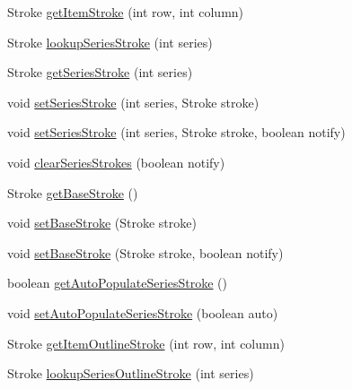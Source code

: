 \begin{DoxyCompactItemize}
\item 
Stroke \mbox{\hyperlink{classorg_1_1jfree_1_1chart_1_1renderer_1_1_abstract_renderer_a269e4670b8c0cf62714bbf4040e01cfa}{get\+Item\+Stroke}} (int row, int column)
\item 
Stroke \mbox{\hyperlink{classorg_1_1jfree_1_1chart_1_1renderer_1_1_abstract_renderer_a883eab51fd555ce119249384790c6d10}{lookup\+Series\+Stroke}} (int series)
\item 
Stroke \mbox{\hyperlink{classorg_1_1jfree_1_1chart_1_1renderer_1_1_abstract_renderer_aa9fd470dafc2d0596ff1ea4ffcb210bc}{get\+Series\+Stroke}} (int series)
\item 
void \mbox{\hyperlink{classorg_1_1jfree_1_1chart_1_1renderer_1_1_abstract_renderer_a3cc8ebf3993621a79db959209be1b184}{set\+Series\+Stroke}} (int series, Stroke stroke)
\item 
void \mbox{\hyperlink{classorg_1_1jfree_1_1chart_1_1renderer_1_1_abstract_renderer_ab32a54a55641ca4e5d6471d3acb9a9ea}{set\+Series\+Stroke}} (int series, Stroke stroke, boolean notify)
\item 
void \mbox{\hyperlink{classorg_1_1jfree_1_1chart_1_1renderer_1_1_abstract_renderer_a229c7ac9859bddca844b7219b563bb96}{clear\+Series\+Strokes}} (boolean notify)
\item 
Stroke \mbox{\hyperlink{classorg_1_1jfree_1_1chart_1_1renderer_1_1_abstract_renderer_a7590a423fb0ba5895a876a7068b37951}{get\+Base\+Stroke}} ()
\item 
void \mbox{\hyperlink{classorg_1_1jfree_1_1chart_1_1renderer_1_1_abstract_renderer_a33600c32414c464c6394827d61f9b374}{set\+Base\+Stroke}} (Stroke stroke)
\item 
void \mbox{\hyperlink{classorg_1_1jfree_1_1chart_1_1renderer_1_1_abstract_renderer_acd0db81ab3940b3e32648ffdce99ed21}{set\+Base\+Stroke}} (Stroke stroke, boolean notify)
\item 
boolean \mbox{\hyperlink{classorg_1_1jfree_1_1chart_1_1renderer_1_1_abstract_renderer_adbbbcbf044e84a629e488d904f88442e}{get\+Auto\+Populate\+Series\+Stroke}} ()
\item 
void \mbox{\hyperlink{classorg_1_1jfree_1_1chart_1_1renderer_1_1_abstract_renderer_aa6fc1f6e57125ab3c30523424b3123bd}{set\+Auto\+Populate\+Series\+Stroke}} (boolean auto)
\item 
Stroke \mbox{\hyperlink{classorg_1_1jfree_1_1chart_1_1renderer_1_1_abstract_renderer_ae283acd1318cfbff61d6128ac4649f54}{get\+Item\+Outline\+Stroke}} (int row, int column)
\item 
Stroke \mbox{\hyperlink{classorg_1_1jfree_1_1chart_1_1renderer_1_1_abstract_renderer_aab0f5b5e5cc74fae532800cd503c3612}{lookup\+Series\+Outline\+Stroke}} (int series)

\end{DoxyCompactItemize}
